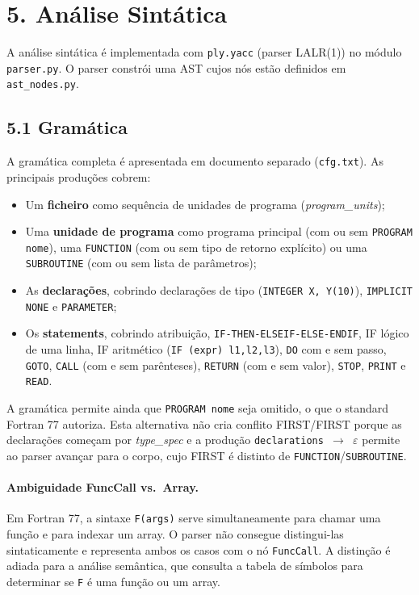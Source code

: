 \documentclass[a4paper]{article}
\begin{document}
\section*{5. Análise Sintática}

\noindent A análise sintática é implementada com \texttt{ply.yacc} (parser LALR(1)) no módulo \texttt{parser.py}. O parser constrói uma AST cujos nós estão definidos em \texttt{ast\_nodes.py}.

\subsection*{5.1 Gramática}

\noindent A gramática completa é apresentada em documento separado (\texttt{cfg.txt}). As principais produções cobrem:

\begin{itemize}
    \item Um \textbf{ficheiro} como sequência de unidades de programa (\textit{program\_units});
    \item Uma \textbf{unidade de programa} como programa principal (com ou sem \texttt{PROGRAM nome}), uma \texttt{FUNCTION} (com ou sem tipo de retorno explícito) ou uma \texttt{SUBROUTINE} (com ou sem lista de parâmetros);
    \item As \textbf{declarações}, cobrindo declarações de tipo (\texttt{INTEGER X, Y(10)}), \texttt{IMPLICIT NONE} e \texttt{PARAMETER};
    \item Os \textbf{statements}, cobrindo atribuição, \texttt{IF-THEN-ELSEIF-ELSE-ENDIF}, IF lógico de uma linha, IF aritmético (\texttt{IF (expr) l1,l2,l3}), \texttt{DO} com e sem passo, \texttt{GOTO}, \texttt{CALL} (com e sem parênteses), \texttt{RETURN} (com e sem valor), \texttt{STOP}, \texttt{PRINT} e \texttt{READ}.
\end{itemize}

\noindent A gramática permite ainda que \texttt{PROGRAM nome} seja omitido, o que o standard Fortran 77 autoriza. Esta alternativa não cria conflito FIRST/FIRST porque as declarações começam por \textit{type\_spec} e a produção \texttt{declarations $\rightarrow$ $\varepsilon$} permite ao parser avançar para o corpo, cujo FIRST é distinto de \texttt{FUNCTION}/\texttt{SUBROUTINE}.

\paragraph{Ambiguidade FuncCall vs.\ Array.} Em Fortran 77, a sintaxe \texttt{F(args)} serve simultaneamente para chamar uma função e para indexar um array. O parser não consegue distingui-las sintaticamente e representa ambos os casos com o nó \texttt{FuncCall}. A distinção é adiada para a análise semântica, que consulta a tabela de símbolos para determinar se \texttt{F} é uma função ou um array.
\end{document}
